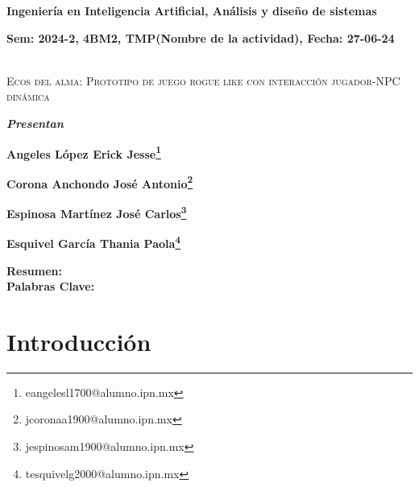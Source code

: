 \documentclass[12pt,twoside]{article}
\begin{document}
	
	\centerline{\bf Ingeniería en Inteligencia Artificial, Análisis y diseño de sistemas}
	
	\centerline{\bf Sem: 2024-2, 4BM2, TMP(Nombre de la actividad), Fecha: 27-06-24\\\\}
	
	\centerline{}
	
	
	
	\begin{center}
		\Large{\textsc{Ecos del alma: Prototipo de juego rogue like con interacción jugador-NPC dinámica}} 
	\end{center}
	\centerline{}
	\centerline{\bf {\textit{Presentan}}}
	\centerline{}
	\centerline{\bf {Angeles López Erick Jesse\footnote{eangelesl1700@alumno.ipn.mx}}}
	\centerline{\bf {Corona Anchondo José Antonio\footnote{jcoronaa1900@alumno.ipn.mx}}}
	\centerline{\bf {	Espinosa Martínez José Carlos\footnote{jespinosam1900@alumno.ipn.mx}}}
	\centerline{\bf {Esquivel García Thania Paola\footnote{tesquivelg2000@alumno.ipn.mx}}}
	
	
	
	\newtheorem{Theorem}{\quad Theorem}[section]
	
	\newtheorem{Definition}[Theorem]{\quad Definition}
	
	\newtheorem{Corollary}[Theorem]{\quad Corollary}
	
	\newtheorem{Lemma}[Theorem]{\quad Lemma}
	
	\newtheorem{Example}[Theorem]{\quad Example}
	
	\bigskip
	
	\bigskip
	
	\textbf{Resumen:}  \\ 
	
	{\bf Palabras Clave:} \\
	
	\clearpage
	
	\tableofcontents
		
	\clearpage
		
	\section{Introducción}
	
	\clearpage
\end{document}
